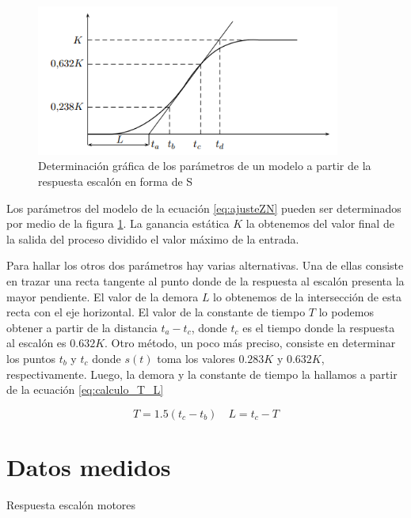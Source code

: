 \documentclass[10pt,conference,a4paper,onecolumn]{article}%
\begin{document}
\begin{figure}[h]
\centering
\includegraphics[width=10cm]{./imagenes/escalon_z-n.png}
\caption{Determinación gráfica de los parámetros de un modelo a partir de
la respuesta escalón en forma de S}
\label{fig:escalon_zn}
\end{figure}




Los parámetros del modelo de la ecuación \ref{eq:ajusteZN} pueden ser determinados por medio de la figura \ref{fig:escalon_zn}. La ganancia estática $K$ la obtenemos del valor final de la salida del proceso dividido el valor máximo de la entrada. 

Para hallar los otros dos parámetros hay varias alternativas. Una de ellas consiste en trazar una recta tangente al punto donde de la respuesta al escalón presenta la mayor pendiente. El valor de la demora $L$ lo obtenemos de la intersección de esta recta con el eje horizontal. El valor de la constante de tiempo $T$ lo podemos obtener a partir de la distancia $t_a-t_c $, donde $t_c$ es el tiempo donde la respuesta al escalón es $0.632K$.
Otro método, un poco más preciso, consiste en determinar los puntos $t_b$ y $t_c$ donde $s(t)$ toma los valores $0.283K$ y $0.632K$, respectivamente. Luego, la demora y la constante de tiempo la hallamos a partir de la ecuación \ref{eq:calculo_T_L}

\begin{equation}
T=1.5(t_c -t_b) \quad	L=t_c-T
\label{eq:calculo_T_L}
\end{equation}




\section{Datos medidos}
Respuesta escalón motores
\end{document}
